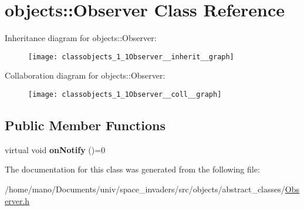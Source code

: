 \hypertarget{classobjects_1_1Observer}{}\section{objects\+:\+:Observer Class Reference}
\label{classobjects_1_1Observer}


Inheritance diagram for objects\+:\+:Observer\+:\nopagebreak
\begin{figure}[H]
\begin{center}
\leavevmode
\texttt{[image: classobjects\_1\_1Observer\_\_inherit\_\_graph]}
\end{center}
\end{figure}


Collaboration diagram for objects\+:\+:Observer\+:\nopagebreak
\begin{figure}[H]
\begin{center}
\leavevmode
\texttt{[image: classobjects\_1\_1Observer\_\_coll\_\_graph]}
\end{center}
\end{figure}
\subsection*{Public Member Functions}
\begin{DoxyCompactItemize}
\item 
\mbox{\label{classobjects_1_1Observer_a6c3561b7219abd0f4de7e21e52a899b8}}
virtual void {\bfseries on\+Notify} ()=0
\end{DoxyCompactItemize}


The documentation for this class was generated from the following file\+:\begin{DoxyCompactItemize}
\item 
/home/mano/\+Documents/univ/space\+\_\+invaders/src/objects/abstract\+\_\+classes/\hyperlink{Observer_8h}{Observer.\+h}\end{DoxyCompactItemize}
